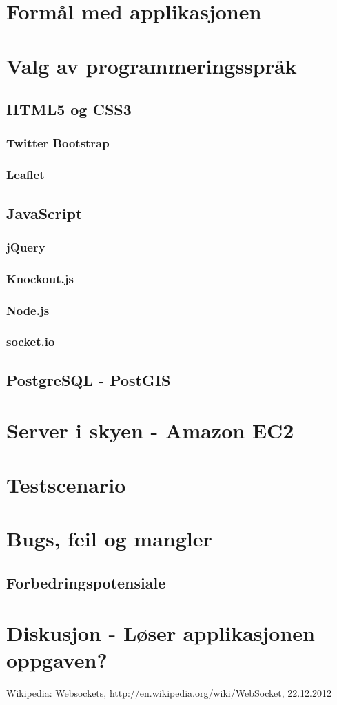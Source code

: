 \documentclass[a4paper]{article}
\begin{document}
\section{Formål med applikasjonen}

\section{Valg av programmeringsspråk}
	
	\subsection{HTML5 og CSS3}
		\subsubsection{Twitter Bootstrap}
		\subsubsection{Leaflet}
	\subsection{JavaScript}
		\subsubsection{jQuery}
		\subsubsection{Knockout.js}
		\subsubsection{Node.js}
		\subsubsection{socket.io}
	\subsection{PostgreSQL - PostGIS}

\section{Server i skyen - Amazon EC2}

\section{Testscenario}
\section{Bugs, feil og mangler}
	\subsection{Forbedringspotensiale}
\section{Diskusjon - Løser applikasjonen oppgaven?}

\newpage
\begin{thebibliography}{9}

	Wikipedia: Websockets, http://en.wikipedia.org/wiki/WebSocket, 22.12.2012


\end{thebibliography}
\end{document}
